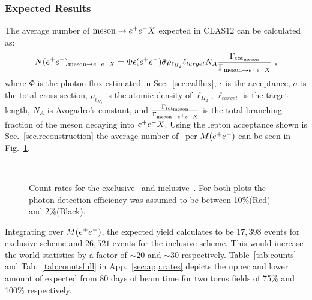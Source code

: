 \subsubsection{Expected Results}
The average number of $\mathrm{meson} \to e^+e^- X$ expected in CLAS12 can be calculated as:
\begin{align}
\bar{N}(e^+e^-)_{\mathrm{meson}  \to e^+e^- X} = \Phi \epsilon(e^+e^-)\bar{\sigma} \rho_{\ell_{H_2}}\ell_{target}N_A \frac{\Gamma_{\mathrm{tot}_\mathrm{meson} }}{\Gamma_{\mathrm{meson}  \to e^+e^- X}}\ ,
\end{align}
where $\Phi$ is the photon flux estimated in Sec.~\ref{sec:calflux}, $\epsilon$ is the acceptance, $\bar{\sigma}$ is the total cross-section, $\rho_{\ell_{H_2}}$ is the atomic density of $\ell_{H_2}$, $\ell_{target}$ is the target length, $N_A$ is Avogadro's constant, and $\frac{\Gamma_{\mathrm{tot}_\mathrm{meson}}}{\Gamma_{\mathrm{meson} \to e^+e^- X}}$ is the total branching fraction of the meson decaying into $e^+e^- X$.
Using the lepton acceptance shown is Sec.~\ref{sec.reconstruction} the average number of \etaTP \  per $M(e^+e^-)$ can be seen in Fig.~\ref{fig:etayield}.
 \begin{figure}[h!]\begin{center}
\\
\caption[Counts rates for \etaTP]{\label{fig:etayield}Count rates for the exclusive~ and inclusive~. For both plots the photon detection efficiency was assumed to be between 10\%(Red) and  2\%(Black). }
\end{center}\end{figure}
\FloatBarrier
Integrating over $M(e^+e^-)$, the expected yield calculates to be $17,398$ events for exclusive scheme and $26,521$ events for the inclusive scheme. This would increase the world statistics by a factor of $\sim 20$ and $\sim 30$ respectively. 
Table~\ref{tab:counts} and Tab.~\ref{tab:countsfull} in App.~\ref{sec:app.rates} depicts the upper and lower amount of \epemT expected from 80 days of beam time for two torus fields of 75\% and 100\% respectively.
\FloatBarrier
